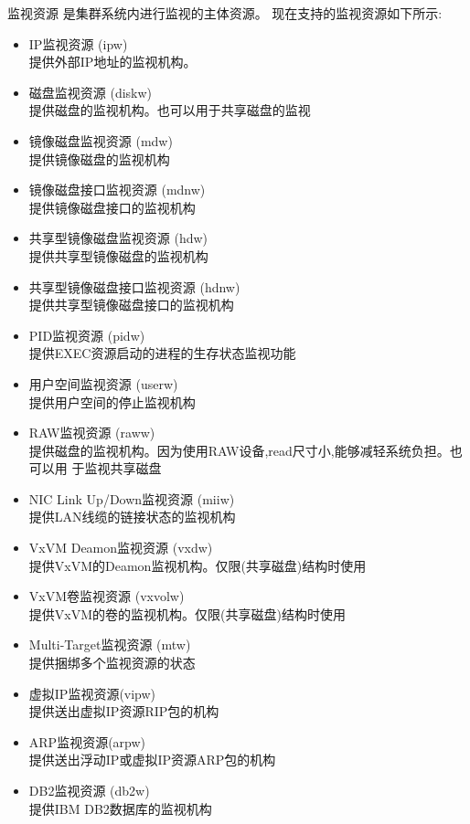 \documentclass[compress,trans]{beamer} %
\begin{document}
\begin{frame}[allowframebreaks=.8,allowdisplaybreaks]{监视资源}
是集群系统内进行监视的主体资源。
现在支持的监视资源如下所示:
\begin{itemize}
  \item IP监视资源 (ipw) \\  提供外部IP地址的监视机构。
  \item  磁盘监视资源 (diskw) \\ 提供磁盘的监视机构。也可以用于共享磁盘的监视
  \item 镜像磁盘监视资源 (mdw) \\  提供镜像磁盘的监视机构
  \item 镜像磁盘接口监视资源 (mdnw) \\ 提供镜像磁盘接口的监视机构
  \item 共享型镜像磁盘监视资源 (hdw) \\提供共享型镜像磁盘的监视机构
  \item 共享型镜像磁盘接口监视资源 (hdnw) \\ 提供共享型镜像磁盘接口的监视机构
  \item PID监视资源 (pidw) \\ 提供EXEC资源启动的进程的生存状态监视功能
  \item 用户空间监视资源 (userw) \\ 提供用户空间的停止监视机构
  \item RAW监视资源 (raww) \\ 提供磁盘的监视机构。因为使用RAW设备,read尺寸小,能够减轻系统负担。也可以用
  于监视共享磁盘
  \item NIC Link Up/Down监视资源 (miiw) \\ 提供LAN线缆的链接状态的监视机构
  \item VxVM Deamon监视资源 (vxdw) \\ 提供VxVM的Deamon监视机构。仅限(共享磁盘)结构时使用
  \item VxVM卷监视资源 (vxvolw) \\ 提供VxVM的卷的监视机构。仅限(共享磁盘)结构时使用
  \item Multi-Target监视资源 (mtw) \\ 提供捆绑多个监视资源的状态
  	\item 虚拟IP监视资源(vipw) \\  提供送出虚拟IP资源RIP包的机构
	\item ARP监视资源(arpw) \\    提供送出浮动IP或虚拟IP资源ARP包的机构
	\item DB2监视资源 (db2w) \\ 提供IBM DB2数据库的监视机构

\end{itemize}
\end{frame}
\end{document}
